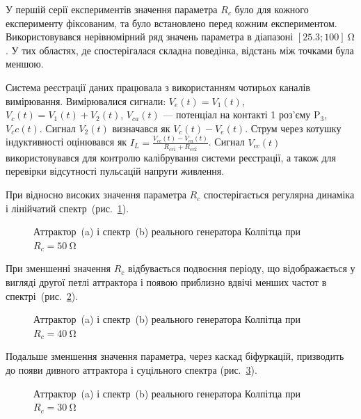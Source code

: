 У першій серії експериментів значення параметра
$R_c $ було для кожного експерименту фіксованим, та було встановлено
перед кожним експериментом. Використовувався нерівномірний
ряд значень параметра в діапазоні
$[25.3; 100] \SI{}{\ohm} $. У тих областях, де спостерігалася складна
поведінка, відстань між точками була меншою.

Система реєстрації даних працювала з використанням чотирьох
каналів вимірювання. Вимірювалися сигнали:
$V_e(t) = V_1(t)$,
$V_c(t) = V_1(t) + V_2(t)$,
$V_{ca}(t)$ ---
потенціал на контакті 1 роз'єму $ \mathrm{P}_3 $,
$V_cc(t)$.
Сигнал
$V_2 (t) $ визначався як
$V_c (t) - V_e (t) $. Струм через котушку індуктивності оцінювався як
$I_L = \frac{V_{cc} (t) - V_{ca} (t)}{R_{cv1} + R_{cv2}} $. Сигнал
$V_{cc} (t) $ використовувався для контролю калібрування системи
реєстрації, а також для перевірки відсутності пульсацій напруги
живлення.



При відносно високих значення параметра
$R_c $ спостерігається регулярна динаміка і лінійчатий
спектр~(рис.~\ref{atu:f:colp_r_attr_f_50}).

\begin{figure}[htb!]
  \caption{Аттрактор~(a) і спектр~(b) реального генератора Колпітца при $ R_c = \SI{50}{\ohm} $}
\label{atu:f:colp_r_attr_f_50}
\end{figure}

При зменшенні значення
$R_c $ відбувається подвоєння періоду, що відображається у вигляді
другої петлі аттрактора і появою приблизно вдвічі менших частот
в спектрі~(рис.~\ref{atu:f:colp_r_attr_f_40}).

\begin{figure}[htb!]
  \caption{Аттрактор~(a) і спектр~(b) реального генератора Колпітца при $ R_c = \SI{40}{\ohm} $}
\label{atu:f:colp_r_attr_f_40}
\end{figure}

Подальше зменшення значення параметра, через каскад біфуркацій,
призводить до появи дивного аттрактора і суцільного спектра
(рис.~\ref{atu:f:colp_r_attr_f_30}).

\begin{figure}[htb!]
  \caption{Аттрактор~(a) і спектр~(b) реального генератора Колпітца при $ R_c = \SI{30}{\ohm} $}
\label{atu:f:colp_r_attr_f_30}
\end{figure}


